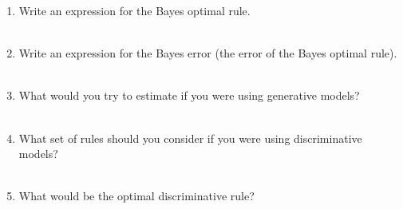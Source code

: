 \documentclass[10pt]{article}
\begin{document}
   \begin{enumerate}
   \item Write an expression for the Bayes optimal rule.
     \\~\\
     \underline{\hspace{6in}}
   \item Write an expression for the Bayes error (the error of the
     Bayes optimal rule).
     \\~\\
     \underline{\hspace{6in}}
   \item What would you try to estimate if you were using 
     generative models?
     \\~\\
     \underline{\hspace{6in}}
   \item What set of rules should you consider if you were using
     discriminative models?
     \\~\\
     \underline{\hspace{6in}}
   \item What would be the optimal discriminative rule?
     \\~\\
     \underline{\hspace{6in}}
   \end{enumerate}
\end{document}
